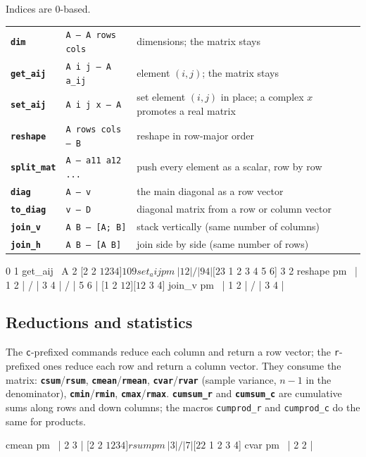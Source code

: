 \documentclass[11pt,letterpaper]{article}
\newcommand{\code}[1]{\texttt{#1}}
\newcommand{\cmd}[1]{\texttt{\textbf{#1}}}
\newcommand{\stk}[1]{\texttt{#1}}
\begin{document}
Indices are 0-based.
\begin{center}
\begin{tabular}{@{}llp{}@{}}
\toprule
\cmd{dim}       & \stk{A -- A rows cols} & dimensions; the matrix stays \\
\cmd{get\_aij}  & \stk{A i j -- A a\_ij}  & element $(i,j)$; the matrix stays \\
\cmd{set\_aij}  & \stk{A i j x -- A}     & set element $(i,j)$ in place; a complex $x$ promotes a real matrix \\
\cmd{reshape}   & \stk{A rows cols -- B} & reshape in row-major order \\
\cmd{split\_mat} & \stk{A -- a11 a12 ...} & push every element as a scalar, row by row \\
\cmd{diag}      & \stk{A -- v}    & the main diagonal as a row vector \\
\cmd{to\_diag}  & \stk{v -- D}    & diagonal matrix from a row or column vector \\
\cmd{join\_v}   & \stk{A B -- [A; B]} & stack vertically (same number of columns) \\
\cmd{join\_h}   & \stk{A B -- [A B]}  & join side by side (same number of rows) \\
\bottomrule
\end{tabular}
\end{center}
\begin{rpn}
[2 2 $ 1 2 3 4] 0 1 get_aij        \ A 2
[2 2 $ 1 2 3 4] 1 0 9 set_aij pm   \ | 1 2 | / | 9 4 |
[2 3 $ 1 2 3 4 5 6] 3 2 reshape pm \ | 1 2 | / | 3 4 | / | 5 6 |
[1 2 $ 1 2] [1 2 $ 3 4] join_v pm  \ | 1 2 | / | 3 4 |
\end{rpn}

\subsection{Reductions and statistics}

The \code{c}-prefixed commands reduce each column and return a row vector; the \code{r}-prefixed ones reduce each row and return a column vector. They consume the matrix: \cmd{csum}/\cmd{rsum}, \cmd{cmean}/\cmd{rmean}, \cmd{cvar}/\cmd{rvar} (sample variance, $n-1$ in the denominator), \cmd{cmin}/\cmd{rmin}, \cmd{cmax}/\cmd{rmax}. \cmd{cumsum\_r} and \cmd{cumsum\_c} are cumulative sums along rows and down columns; the macros \code{cumprod\_r} and \code{cumprod\_c} do the same for products.
\begin{rpn}
[2 2 $ 1 2 3 4] cmean pm       \ | 2 3 |
[2 2 $ 1 2 3 4] rsum pm        \ | 3 | / | 7 |
[2 2 $ 1 2 3 4] cvar pm        \ | 2 2 |
\end{rpn}
\end{document}
